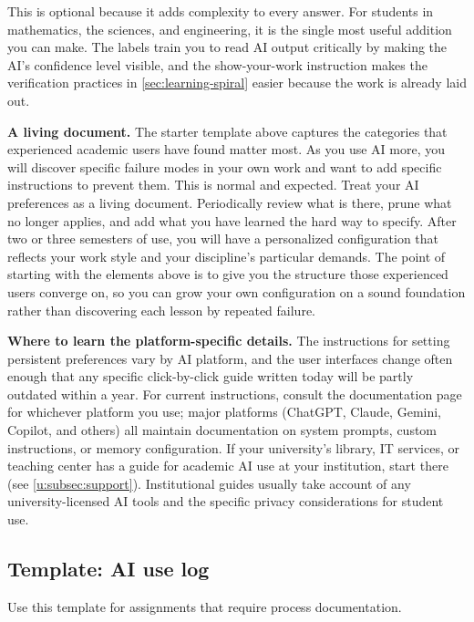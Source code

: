 \documentclass{SIAMbook2023}
\begin{document}
\begin{enumerate}
This is optional because it adds complexity to every answer. For students in mathematics, the sciences, and engineering, it is the single most useful addition you can make. The labels train you to read AI output critically by making the AI's confidence level visible, and the show-your-work instruction makes the verification practices in \cref{sec:learning-spiral} easier because the work is already laid out.
\end{enumerate}

\textbf{A living document.} The starter template above captures the categories that experienced academic users have found matter most. As you use AI more, you will discover specific failure modes in your own work and want to add specific instructions to prevent them. This is normal and expected. Treat your AI preferences as a living document. Periodically review what is there, prune what no longer applies, and add what you have learned the hard way to specify. After two or three semesters of use, you will have a personalized configuration that reflects your work style and your discipline's particular demands. The point of starting with the elements above is to give you the structure those experienced users converge on, so you can grow your own configuration on a sound foundation rather than discovering each lesson by repeated failure.

\textbf{Where to learn the platform-specific details.} The instructions for setting persistent preferences vary by AI platform, and the user interfaces change often enough that any specific click-by-click guide written today will be partly outdated within a year. For current instructions, consult the documentation page for whichever platform you use; major platforms (ChatGPT, Claude, Gemini, Copilot, and others) all maintain documentation on system prompts, custom instructions, or memory configuration. If your university's library, IT services, or teaching center has a guide for academic AI use at your institution, start there (see \cref{u:subsec:support}). Institutional guides usually take account of any university-licensed AI tools and the specific privacy considerations for student use.

\subsection{Template: AI use log}
\label{app:ai-use-log}

Use this template for assignments that require process documentation.
\end{document}
